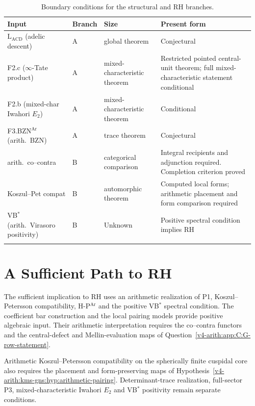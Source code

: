 {\small
\begin{longtable}{@{}>{\raggedright\arraybackslash}p{}|>{\raggedright\arraybackslash}p{}|>{\raggedright\arraybackslash}p{}|>{\raggedright\arraybackslash}p{}@{}}
Input & Branch & Size & Present form \\
\hline
\endhead
\(\mathrm{L}_{\mathrm{ACD}}\) (adelic descent) & A & global theorem & Conjectural \\
F2.c (\(\infty\)-Tate product) & A & mixed-characteristic theorem & Restricted pointed central-unit theorem; full mixed-characteristic statement conditional \\
F2.b (mixed-char Iwahori \(E_{2}\)) & A & mixed-characteristic theorem & Conditional \\
F3.BZN\(^{\mathrm{Ar}}\) (arith.~BZN) & A & trace theorem & Conjectural \\
arith.~co--contra & B & categorical comparison & Integral recipients and adjunction required. Completion criterion proved \\
Koszul--Pet compat & B & automorphic theorem & Computed local forms; arithmetic placement and form comparison required \\
VB\(^{*}\) (arith.~Virasoro positivity) & B & Unknown & Positive spectral condition implies RH \\
\caption{Boundary conditions for the structural and RH branches.}
\label{v4-arith:app:C:residual-table}\\
\end{longtable}
}

\section{A Sufficient Path to RH}
\label{v4-arith:app:C:sufficient-path}

The sufficient implication to RH uses an arithmetic realization
of P1, Koszul--Petersson compatibility, H-P\(^{\mathrm{Ar}}\)
and the positive VB\(^{*}\) spectral condition.
The coefficient bar construction and the local pairing models
provide positive algebraic input. Their arithmetic interpretation
requires the co--contra functors and the central-defect and
Mellin-evaluation maps of
Question~\ref{v4-arith:app:C:G-row-statement}.

Arithmetic Koszul--Petersson compatibility on the spherically
finite cuspidal core also requires the placement and
form-preserving maps of
Hypothesis~\ref{v4-arith:kms-gns:hyp:arithmetic-pairing}.
Determinant-trace realization, full-sector P3, mixed-characteristic
Iwahori \(E_2\) and VB\(^{*}\) positivity remain separate conditions.

